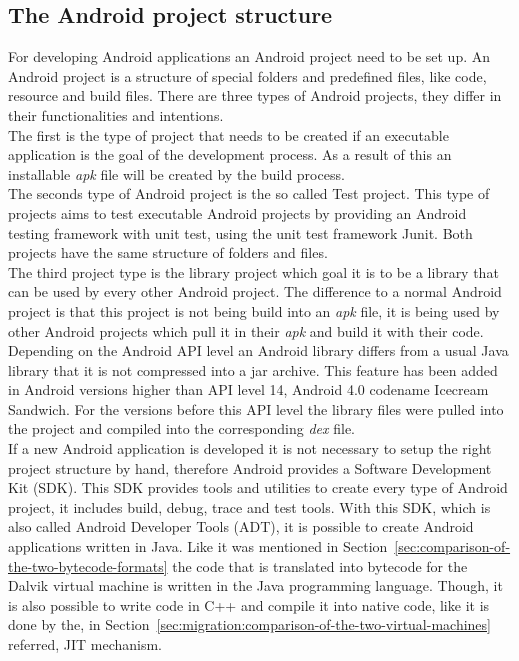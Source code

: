 \subsection{The Android project structure}
\label{sec:migration:the-android-project-structure}
For developing Android applications an Android project need to be set up.
An Android project is a structure of special folders and predefined files, like code, resource and build files.
There are three types of Android projects, they differ in their functionalities and intentions.\\
The first is the type of project that needs to be created if an executable application is the goal of the development process.
As a result of this an installable \textit{apk} file will be created by the build process.\\
The seconds type of Android project is the so called Test project.
This type of projects aims to test executable Android projects by providing an Android testing framework with unit test, using the unit test framework Junit.
Both projects have the same structure of folders and files.\\
The third project type is the library project which goal it is to be a library that can be used by every other Android project.
The difference to a normal Android project is that this project is not being build into an \textit{apk} file, it is being used by other Android projects which pull it in their \textit{apk} and build it with their code.
Depending on the Android API level an Android library differs from a usual Java library that it is not compressed into a jar archive.
This feature has been added in Android versions higher than API level 14, Android 4.0 codename Icecream Sandwich.
For the versions before this API level the library files were pulled into the project and compiled into the corresponding \textit{dex} file.\\
If a new Android application is developed it is not necessary to setup the right project structure by hand, therefore Android provides a Software Development Kit (SDK).
This SDK provides tools and utilities to create every type of Android project, it includes build, debug, trace and test tools.
With this SDK, which is also called Android Developer Tools (ADT), it is possible to create Android applications written in Java.
Like it was mentioned in Section~\ref{sec:comparison-of-the-two-bytecode-formats} the code that is translated into bytecode for the Dalvik virtual machine is written in the Java programming language.
Though, it is also possible to write code in C++ and compile it into native code, like it is done by the, in Section~\ref{sec:migration:comparison-of-the-two-virtual-machines} referred, JIT mechanism.
